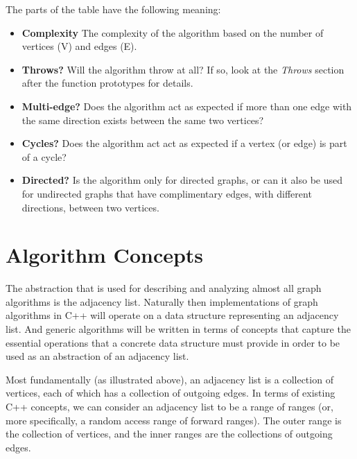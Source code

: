 The parts of the table have the following meaning:
\begin{itemize}
      \item \textbf{Complexity} The complexity of the algorithm based on the number of vertices (V) and edges (E).
      \item \textbf{Throws?} Will the algorithm throw at all? If so, look at the \textit{Throws} section after the function prototypes for details.
      \item \textbf{Multi-edge?} Does the algorithm act as expected if more than one edge with the same direction exists between the same two vertices?
      \item \textbf{Cycles?} Does the algorithm act act as expected if a vertex (or edge) is part of a cycle?
      \item \textbf{Directed?} Is the algorithm only for directed graphs, or can it also be used for undirected graphs that have complimentary
                               edges, with different directions, between two vertices.
\end{itemize}



\section{Algorithm Concepts}


The abstraction that is used for describing and analyzing almost all graph algorithms is the adjacency list.  Naturally then implementations of graph algorithms in C++ will operate on a data structure representing an adjacency list.  And generic algorithms will be written in terms of concepts that capture the essential operations that a concrete data structure must provide in order to be used as an abstraction of an adjacency list.

Most fundamentally (as illustrated above), an adjacency list is a collection of vertices, each of which has a collection of outgoing edges.  In terms of existing C++ concepts, we can consider an adjacency list to be a range of ranges (or, more specifically, a random access range of forward ranges).  The outer range is the collection of vertices, and the inner ranges are the collections of outgoing edges.


